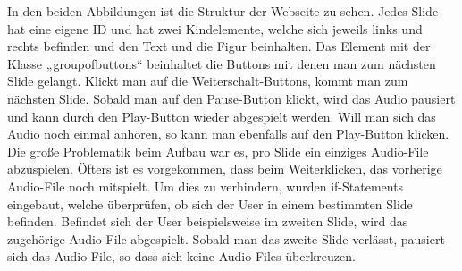 In den beiden Abbildungen ist die Struktur der Webseite zu sehen. Jedes Slide hat eine eigene ID und hat zwei Kindelemente, welche sich jeweils links und rechts befinden und den Text und die Figur beinhalten. Das Element mit der Klasse „groupofbuttons“ beinhaltet die Buttons mit denen man zum nächsten Slide gelangt. Klickt man auf die Weiterschalt-Buttons, kommt man zum nächsten Slide. Sobald man auf den Pause-Button klickt, wird das Audio pausiert und kann durch den Play-Button wieder abgespielt werden. Will man sich das Audio noch einmal anhören, so kann man ebenfalls auf den Play-Button klicken. Die große Problematik beim Aufbau war es, pro Slide ein einziges Audio-File abzuspielen. Öfters ist es vorgekommen, dass beim Weiterklicken, das vorherige Audio-File noch mitspielt. Um dies zu verhindern, wurden if-Statements eingebaut, welche überprüfen, ob sich der User in einem bestimmten Slide befinden. Befindet sich der User beispielsweise im zweiten Slide, wird das zugehörige Audio-File abgespielt. Sobald man das zweite Slide verlässt, pausiert sich das Audio-File, so dass sich keine Audio-Files überkreuzen. 

